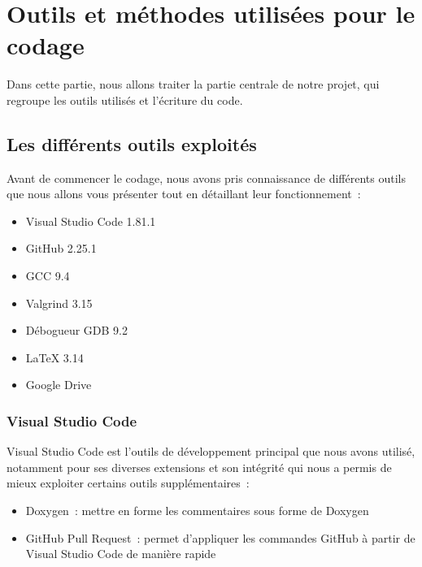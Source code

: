 \documentclass[12pt,a4paper]{article}
\begin{document}
    \newpage

    \section{Outils et méthodes utilisées pour le codage}
        \tabto{1cm} Dans cette partie, nous allons traiter la partie centrale de notre projet, qui regroupe les outils utilisés et l'écriture du code.

        \subsection{Les différents outils exploités}
            \tabto{1cm} Avant de commencer le codage, nous avons pris connaissance de différents outils que nous allons vous présenter tout en détaillant leur fonctionnement~:\\
            
            \begin{itemize}
                \item Visual Studio Code 1.81.1
                \item GitHub 2.25.1
                \item GCC  9.4
                \item Valgrind 3.15
                \item Débogueur GDB 9.2
                \item LaTeX 3.14
                \item Google Drive
            \end{itemize}

             \subsubsection{Visual Studio Code}
                \tabto{1cm} Visual Studio Code est l’outils de développement principal que nous avons utilisé, notamment pour ses diverses extensions et son intégrité qui nous a permis de mieux exploiter certains outils supplémentaires~:\\
                
                \begin{itemize}
                    \item Doxygen~: mettre en forme les commentaires sous forme de Doxygen
                    \item GitHub Pull Request~: permet d’appliquer les commandes GitHub à partir de Visual Studio Code de manière rapide
                \end{itemize}
                
\end{document}
